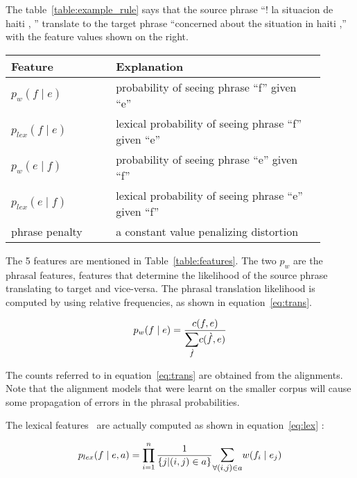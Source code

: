 The table~\ref{table:example_rule}  says that the source phrase ``! la situacion de haiti , '' translate to the target phrase ``concerned about the situation in haiti ,'' with the feature values shown on the right. 

\begin{table*}
	\small
	\small
	\begin{tabular}{p{0.3\linewidth}p{0.6\linewidth}}
	\toprule
	Feature &  Explanation \\
	\toprule
	$p_{w}(f \mid e)$ & probability of seeing phrase ``f'' given ``e'' \\
	$p_{lex}(f \mid e)$ & lexical probability of seeing phrase ``f'' given ``e'' \\
	$p_{w}(e \mid f)$ & probability of seeing phrase ``e'' given ``f'' \\
	$p_{lex}(e \mid f)$ & lexical probability of seeing phrase ``e'' given ``f'' \\
   	phrase penalty & a constant value penalizing distortion \\
	\bottomrule
	\end{tabular}
	\caption{Features of the phrase pairs, where ``f'' is foreign/source \& ``e'' is target/english}
	\label{table:features}
\end{table*}

The 5 features are mentioned in Table~\ref{table:features}. The two $p_{w}$ are the phrasal features, features that determine the likelihood of the source phrase translating to target and vice-versa. The phrasal translation likelihood is computed by using relative frequencies, as shown in equation~\eqref{eq:trans}.

\begin{equation} \label{eq:trans}
	p_{w}(f \mid e) = \frac{c(f, e)}{\mathlarger{\sum\limits_{\grave{f}}}c(\grave{f}, e)}
\end{equation}

The counts referred to in equation~\eqref{eq:trans} are obtained from the alignments. Note that the alignment models that were learnt on the smaller corpus will cause some propagation of errors in the phrasal probabilities. 

 The lexical features~\cite{Koehn:03} are actually computed as shown in equation~\eqref{eq:lex} : 

\begin{equation} \label{eq:lex}
	p_{lex}(f \mid e, a) = \prod\limits_{i=1}^{n} \frac{1}{\{j | (i,j) \in a\}}
	\mathlarger{\sum\limits_{\forall (i,j) \in a}} w(f_{i} \mid e_{j})
\end{equation}


